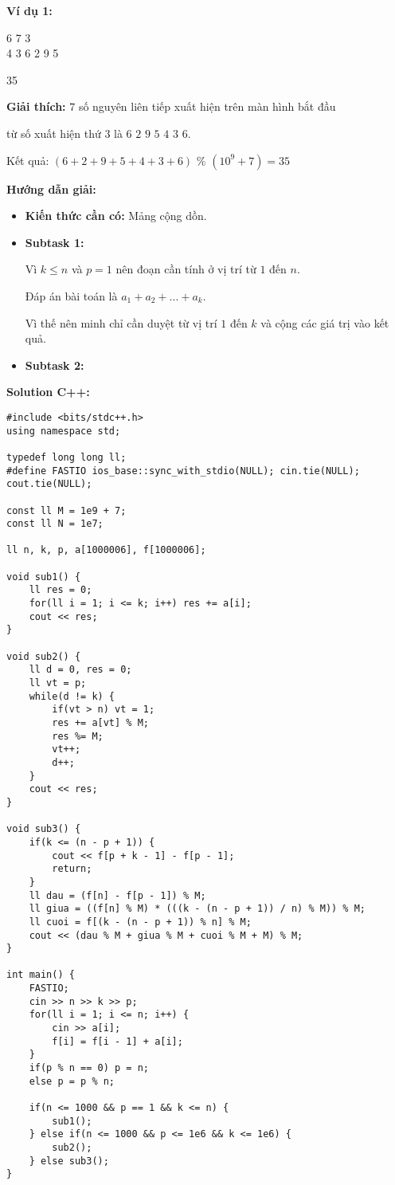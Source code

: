 \documentclass[12pt]{scrartcl}  %
\begin{document}
\textbf{Ví dụ 1:}
\begin{tcolorbox}[colback=gray!5!white, colframe=blue!50!black, title=Input]
6 7 3\\
4 3 6 2 9 5
\end{tcolorbox}
\begin{tcolorbox}[colback=gray!5!white, colframe=green!50!black, title=Output]
35
\end{tcolorbox}

\textbf{Giải thích:}
$7$ số nguyên liên tiếp xuất hiện trên màn hình bắt đầu

từ số xuất hiện thứ $3$ là $6$ $2$ $9$ $5$ $4$ $3$ $6$.

Kết quả: $(6 + 2 + 9 + 5 + 4 + 3 + 6)$ \% $(10^9 + 7) = 35$

\textbf{Hướng dẫn giải:}

\begin{itemize}
    \item \textbf{Kiến thức cần có:} Mảng cộng dồn.
    \item \textbf{Subtask 1:}
    
    Vì $k \leq n$ và $p = 1$ nên đoạn cần tính ở vị trí từ $1$ đến $n$.

    Đáp án bài toán là $a_1 + a_2 + ... + a_k$.

    Vì thế nên minh chỉ cần duyệt từ vị trí $1$ đến $k$ và cộng các giá trị vào kết quả.

    \item \textbf{Subtask 2:}
\end{itemize}

\textbf{Solution C++:}

\begin{lstlisting}
#include <bits/stdc++.h>
using namespace std;

typedef long long ll;
#define FASTIO ios_base::sync_with_stdio(NULL); cin.tie(NULL); cout.tie(NULL);

const ll M = 1e9 + 7;
const ll N = 1e7;

ll n, k, p, a[1000006], f[1000006];

void sub1() {
    ll res = 0;
    for(ll i = 1; i <= k; i++) res += a[i];
    cout << res;
}

void sub2() {
    ll d = 0, res = 0;
    ll vt = p;
    while(d != k) {
        if(vt > n) vt = 1;
        res += a[vt] % M;
        res %= M;
        vt++;
        d++;
    }
    cout << res;
}

void sub3() {
    if(k <= (n - p + 1)) {
        cout << f[p + k - 1] - f[p - 1];
        return;
    }
    ll dau = (f[n] - f[p - 1]) % M;
    ll giua = ((f[n] % M) * (((k - (n - p + 1)) / n) % M)) % M;
    ll cuoi = f[(k - (n - p + 1)) % n] % M;
    cout << (dau % M + giua % M + cuoi % M + M) % M;
}

int main() {
    FASTIO;
    cin >> n >> k >> p;
    for(ll i = 1; i <= n; i++) {
        cin >> a[i];
        f[i] = f[i - 1] + a[i];
    }
    if(p % n == 0) p = n;
    else p = p % n;

    if(n <= 1000 && p == 1 && k <= n) {
        sub1();
    } else if(n <= 1000 && p <= 1e6 && k <= 1e6) {
        sub2();
    } else sub3();
}
\end{lstlisting}
\end{document}
